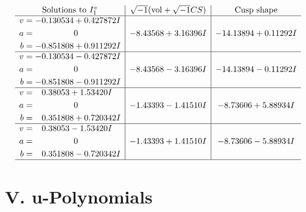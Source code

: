 \documentclass[1p]{elsarticle_modified}
\theoremstyle{definition}
\newcommand{\I}{\sqrt{-1}}
\begin{document}
$$\begin{array}{c|c|c}  
\text{Solutions to }I^v_{1}& \I (\text{vol} + \sqrt{-1}CS) & \text{Cusp shape}\\
 \hline 
\begin{aligned}
v &= -0.130534 + 0.427872 I \\
a &= \phantom{-0.000000 } 0 \\
b &= -0.851808 + 0.911292 I\end{aligned}
 & -8.43568 + 3.16396 I & -14.13894 + 0.11292 I \\ \hline\begin{aligned}
v &= -0.130534 - 0.427872 I \\
a &= \phantom{-0.000000 } 0 \\
b &= -0.851808 - 0.911292 I\end{aligned}
 & -8.43568 - 3.16396 I & -14.13894 - 0.11292 I \\ \hline\begin{aligned}
v &= \phantom{-}0.38053 + 1.53420 I \\
a &= \phantom{-0.000000 } 0 \\
b &= \phantom{-}0.351808 + 0.720342 I\end{aligned}
 & -1.43393 - 1.41510 I & -8.73606 + 5.88934 I \\ \hline\begin{aligned}
v &= \phantom{-}0.38053 - 1.53420 I \\
a &= \phantom{-0.000000 } 0 \\
b &= \phantom{-}0.351808 - 0.720342 I\end{aligned}
 & -1.43393 + 1.41510 I & -8.73606 - 5.88934 I\\
 \hline 
 \end{array}$$\newpage
\newpage\renewcommand{\arraystretch}{1}
\centering \section*{ V. u-Polynomials}
\end{document}
